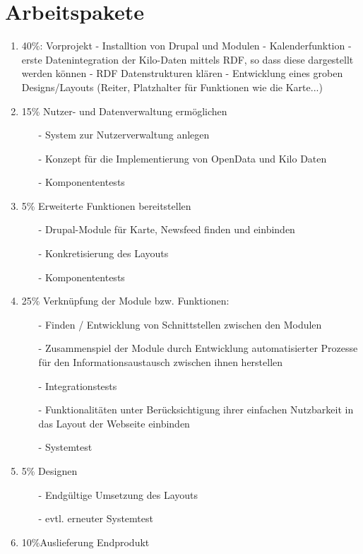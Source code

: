 \documentclass{swp}
\begin{document}
\section{Arbeitspakete}
\begin{enumerate}
\item 40\%: Vorprojekt - Installtion von Drupal und Modulen - Kalenderfunktion - erste Datenintegration der Kilo-Daten mittels RDF, so dass diese dargestellt werden k\"onnen - RDF Datenstrukturen kl\"aren - Entwicklung eines groben Designs/Layouts (Reiter, Platzhalter f\"ur Funktionen wie die Karte...)
\item 15\% Nutzer- und Datenverwaltung erm\"oglichen
\begin{itemize}
\item[-]System zur Nutzerverwaltung anlegen
\item[-]Konzept f\"ur die Implementierung von OpenData und Kilo Daten
\item[-]Komponententests
\end{itemize}
\item 5\% Erweiterte Funktionen bereitstellen
\begin{itemize}
\item[-]Drupal-Module f\"ur Karte, Newsfeed finden und einbinden
\item[-]Konkretisierung des Layouts
\item[-]Komponententests
\end{itemize}
\item 25\% Verkn\"upfung der Module bzw. Funktionen:
\begin{itemize}
\item[-]Finden / Entwicklung von Schnittstellen zwischen den Modulen
\item[-]Zusammenspiel der Module durch Entwicklung automatisierter Prozesse f\"ur den Informationsaustausch zwischen ihnen herstellen
\item[-]Integrationstests
\item[-]Funktionalit\"aten unter Ber\"ucksichtigung ihrer einfachen Nutzbarkeit in das Layout der Webseite einbinden
\item[-]Systemtest
\end{itemize}
\item 5\% \glqq Designen\grqq{}
\begin{itemize}
\item[-]Endg\"ultige Umsetzung des Layouts
\item[-]evtl. erneuter Systemtest
\end{itemize}
\item 10\%Auslieferung Endprodukt

\end{enumerate}
\end{document}
